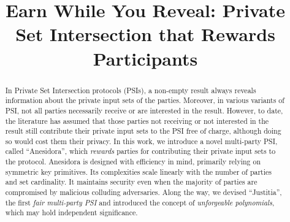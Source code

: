 \documentclass[runningheads]{llncs}
\newcommand{\withRew}{{Anesidora}\xspace}
\newcommand{\withFai}{{Justitia}\xspace}
\begin{document}
  \setlength\abovedisplayskip{0pt}
  \setlength\belowdisplayskip{0pt}


\newenvironment{packed_item}{
\begin{itemize}
	\setlength{\topsep}{0pt}
	\setlength{\partopsep}{0pt}
  \setlength{\itemsep}{0pt}
  \setlength{\parskip}{0pt}
  \setlength{\parsep}{0pt}
}{\end{itemize}}

\newenvironment{packed_enum}{
\begin{enumerate}
	\setlength{\topsep}{0pt}
	\setlength{\partopsep}{0pt}
  \setlength{\itemsep}{0pt}
  \setlength{\parskip}{0pt}
  \setlength{\parsep}{0pt}
}{\end{enumerate}}




\title{Earn While You Reveal: Private Set Intersection that Rewards Participants}
%



\author{}
\institute{}
\date{}
\maketitle{}


\begin{abstract}
In Private Set Intersection protocols (PSIs), a non-empty result always reveals information about the private input sets of the parties. Moreover, in various variants of PSI, not all parties necessarily receive or are interested in the result. However, to date, the literature has assumed that those parties not receiving or not interested in the result still contribute their private input sets to the PSI free of charge, although doing so would cost them their privacy. In this work, we introduce a novel multi-party PSI, called ``\withRew'', which \emph{rewards} parties for contributing their private input sets to the protocol.  %
\withRew is designed with efficiency in mind, primarily relying on symmetric key primitives.  Its complexities scale linearly with the number of parties and set cardinality. It maintains security even when the majority of parties are compromised by malicious colluding adversaries. Along the way, we devised ``\withFai'', the first \textit{fair multi-party PSI} and introduced the concept of \textit{unforgeable polynomials}, which may hold independent significance.
\end{abstract}
\end{document}
